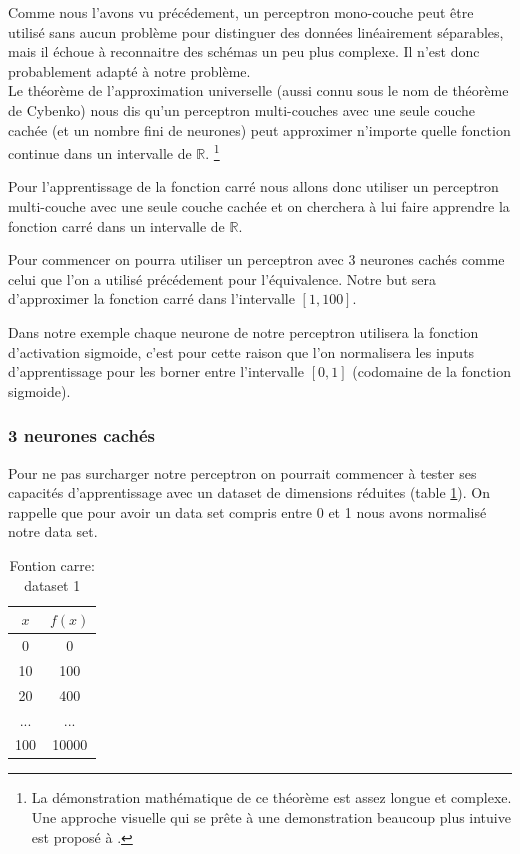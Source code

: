 \documentclass[twoside,openright,a4paper,11pt,french]{article}
\begin{document}
Comme nous l'avons vu précédement, un perceptron mono-couche peut être utilisé sans aucun
problème pour distinguer des données linéairement séparables, mais il échoue 
à reconnaitre des schémas un peu plus complexe. Il n'est donc 
probablement adapté à notre problème.\\

Le théorème de l'approximation universelle (aussi connu sous le nom de théorème de Cybenko) 
nous dis qu'un perceptron multi-couches avec une seule couche cachée (et un nombre
fini de neurones) peut approximer n'importe quelle fonction continue dans un 
intervalle de $\mathbb{R}$.
\footnote{
La démonstration mathématique de ce théorème est assez longue et complexe. Une approche visuelle
qui se prête à une demonstration beaucoup plus intuive est proposé à \cite{visuniprof}.
}
\cite{cybthm}

Pour l'apprentissage de la fonction carré nous allons donc utiliser un perceptron
multi-couche avec une seule couche cachée et on cherchera à lui faire apprendre
la fonction carré dans un intervalle de $\mathbb{R}$.

Pour commencer on pourra utiliser un perceptron avec 3 neurones cachés comme
celui que l'on a utilisé précédement pour l'équivalence. Notre but sera
d'approximer la fonction carré dans l'intervalle $[1,100]$.

Dans notre exemple chaque neurone de notre perceptron utilisera la fonction
d'activation sigmoide, c'est pour cette raison que l'on normalisera les inputs
d'apprentissage pour les borner entre l'intervalle $[0,1]$ (codomaine de la
fonction sigmoide).

\subsubsection{3 neurones cachés}

Pour ne pas surcharger notre  perceptron on pourrait commencer à tester
ses capacités d'apprentissage avec un dataset de dimensions réduites (table
\ref{tab:fqt1}). On rappelle que pour avoir un data set compris entre 0 et 1
nous avons normalisé notre data set.

\begin{table}[ht]
  \centering
  \begin{tabular}{| c | c |}
    \hline
    \textbf{$x$} & \textbf{$f(x)$}\\
    \hline
    0 & 0 \\
    \hline
    10 & 100 \\
    \hline
    20 & 400 \\
    \hline
    ... & ... \\
    \hline
    100 & 10000 \\
    \hline
  \end{tabular}
  \caption{Fontion carre: dataset 1}
  \label{tab:fqt1}
\end{table}
\end{document}
